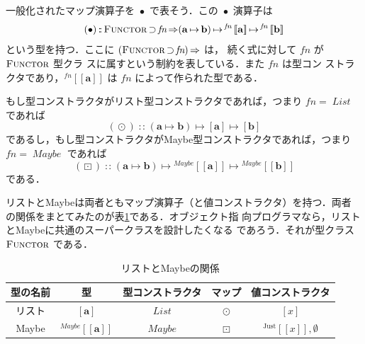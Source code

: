 \documentclass[a5paper,twoside,fleqn]{jsbook}
\def\[{\left[\!\left[}
\def\]{\right]\!\right]}
\DeclareMathOperator{\mSuperClass}{\Rightarrow}
\DeclareMathOperator{\mSuperSet}{\supset}
\newcommand{\mNothing}{\emptyset}
\DeclareMathOperator{\mIn}{{:\!:}}
\DeclareMathOperator{\mMap}{\bullet}
\DeclareMathOperator{\mMapList}{\odot}
\DeclareMathOperator{\mMapMaybe}{\boxdot}
\DeclareMathOperator{\mMapsTo}{\mapsto}
\newcommand{\mType}[1]{\mathbf{#1}}
\newcommand{\mListType}[1]{[\mType{#1}]}
\newcommand{\mGenericTypeAssemble}[2]{{}^{\mTypeConstructor{#1}}\[\mType{#2}\]}
\newcommand{\mMaybeType}[1]{\mGenericTypeAssemble{Maybe}{#1}}
\newcommand{\mTypeConstructor}[1]{\textit{#1}}
\DeclareMathOperator{\mListTypeConstructor}{\mTypeConstructor{List}}
\DeclareMathOperator{\mMaybeTypeConstructor}{\mTypeConstructor{Maybe}}
\newcommand{\mGenericValueConstructor}[1]{\mathrm{#1}}
\newcommand{\mGenericWith}[2]{{}^\mGenericValueConstructor{#1}\[#2\]}
\newcommand{\mJustWith}[1]{\mGenericWith{Just}{#1}}
\newcommand{\mListWith}[1]{\left[#1\right]}
\newcommand{\mGenericTypeClass}[1]{\textsc{#1}} %
\newcommand{\mFunctorTypeClass}{\mGenericTypeClass{Functor}}
\newcommand{\mProj}[2]{#1\mMapsTo#2}
\begin{document}
一般化されたマップ演算子を $\mMap$ で表そう．この $\mMap$ 演算子は
\begin{equation}
(\mMap)
\mIn{}\mFunctorTypeClass\mSuperSet\mTypeConstructor{fn}
\mSuperClass\mProj{
  \mProj{(\mProj{\mType{a}}{\mType{b}})}
        {\mGenericTypeAssemble{fn}{a}}}
                  {\mGenericTypeAssemble{fn}{b}}
\end{equation}
という型を持つ．ここに
$(\mFunctorTypeClass\mSuperSet\mTypeConstructor{fn})\mSuperClass$ は，
続く式に対して $\mTypeConstructor{fn}$ が $\mFunctorTypeClass$ 型クラ
スに属すという制約を表している．また $\mTypeConstructor{fn}$ は型コン
ストラクタであり，$\mGenericTypeAssemble{fn}{a}$ は
$\mTypeConstructor{fn}$ によって作られた型である．

もし型コンストラクタがリスト型コンストラクタであれば，つまり
$\mTypeConstructor{fn}=\mListTypeConstructor$ であれば
\begin{equation}
  (\mMapList)\mIn{}\mProj{\mProj{(\mProj{\mType{a}}
      {\mType{b}})}{\mListType{a}}}{\mListType{b}}
\end{equation}
であるし，もし型コンストラクタがMaybe型コンストラクタであれば，つまり
$\mTypeConstructor{fn}=\mMaybeTypeConstructor$ であれば
\begin{equation}
  (\mMapMaybe)\mIn{}\mProj{\mProj{(\mProj{\mType{a}}{\mType{b}})}
    {\mMaybeType{a}}}{\mMaybeType{b}}
\end{equation}
である．

リストとMaybeは両者ともマップ演算子（と値コンストラクタ）を持つ．両者
の関係をまとてみたのが表\ref{tab:list-and-maybe}である．オブジェクト指
向プログラマなら，リストとMaybeに共通のスーパークラスを設計したくなる
であろう．それが型クラス $\mFunctorTypeClass$ である．

\begin{table}
\label{tab:list-and-maybe}
\caption{リストとMaybeの関係}
\begin{center}
\begin{tabular}{||c|c|c|c|c||}\hline
型の名前&型&型コンストラクタ&マップ&値コンストラクタ\\\hline\hline
リスト&$\mListType{a}$&$\mListTypeConstructor$&$\mMapList$&$\mListWith{x}$\\
Maybe&$\mMaybeType{a}$&$\mMaybeTypeConstructor$&$\mMapMaybe$&$\mJustWith{x},\mNothing$\\\hline
\end{tabular}
\end{center}
\end{table}
\end{document}
